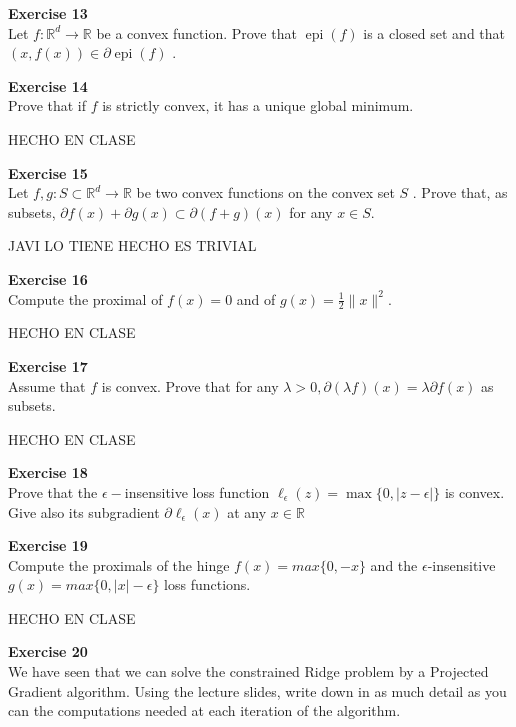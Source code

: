 \documentclass[11pt,table]{article}
\newenvironment{problem}[2][Exercise]
    { \begin{mdframed}[backgroundcolor=gray!20] \textbf{#1 #2} \\}
    {  \end{mdframed}}
\newcommand\abs[1]{\lvert#1\rvert}
\newcommand\R{\mathbb R}
\begin{document}
\begin{problem}{13}
  Let \( f : \mathbb{R}^d \to \mathbb{R} \) be a convex function. Prove that \( \operatorname{epi}(f) \) is a closed set and that \( (x, f(x)) \in \partial \operatorname{epi}(f) \)  .
\end{problem}



\begin{problem}{14}
  Prove that if \( f \)  is strictly convex, it has a unique global minimum.
\end{problem}

HECHO EN CLASE\\

\begin{problem}{15}
  Let \( f,g: S \subset \mathbb{R}^d \to \mathbb{R} \)  be two convex functions on the convex set \( S \) . Prove that, as subsets, \(  \partial f(x) + \partial g(x) \subset \partial(f+g)(x) \) for any $x\in S$.
  \end{problem}

JAVI LO TIENE HECHO ES TRIVIAL \\

\begin{problem}{16}
  Compute the proximal of \( f(x) = 0 \) and of \( g(x) = \frac{1}{2}\|x\|^2 \).
\end{problem}

HECHO EN CLASE\\

\begin{problem}{17}
  Assume that \( f \)  is convex. Prove that for any \( \lambda > 0, \partial(\lambda f)(x) = \lambda \partial f(x) \) as subsets.
\end{problem}

HECHO EN CLASE \\

\begin{problem}{18}
Prove that the \(\epsilon-\)insensitive loss function \(\ell_\epsilon(z) = \max\{0,\abs{z - \epsilon}\}\) is convex. Give also its subgradient \(\partial \ell_\epsilon(x)\) at any \(x \in \R\)
\end{problem}



\begin{problem}{19}Compute the proximals of the hinge \( f(x) = max\{0, -x\}  \) and the \( \epsilon \)-insensitive \( g(x)=max\{0, |x| - \epsilon\} \) loss functions.
  \end{problem}

  HECHO EN CLASE\\

  \begin{problem}{20}
    We have seen that we can solve the constrained Ridge problem by a Projected Gradient algorithm. Using the lecture slides, write down in as much detail as you can the computations needed at each iteration of the algorithm.
  \end{problem}
\end{document}
